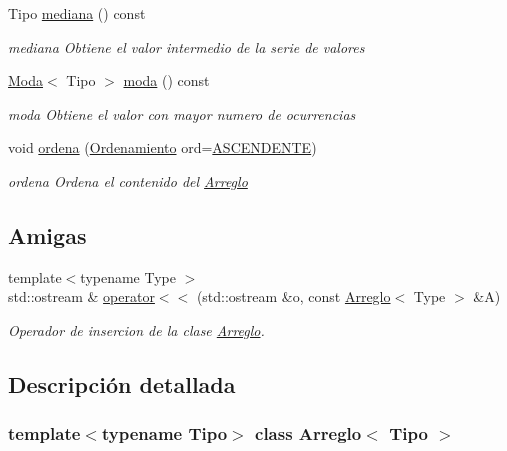 \begin{DoxyCompactItemize}
Tipo \hyperlink{class_arreglo_a84a3c8f3187822db817d8bb29e377e07}{mediana} () const
\begin{DoxyCompactList}\small\item\em mediana Obtiene el valor intermedio de la serie de valores \end{DoxyCompactList}\item 
\hyperlink{struct_moda}{Moda}$<$ Tipo $>$ \hyperlink{class_arreglo_aa88660ef09061682eb6e2a78e96b76c1}{moda} () const
\begin{DoxyCompactList}\small\item\em moda Obtiene el valor con mayor numero de ocurrencias \end{DoxyCompactList}\item 
void \hyperlink{class_arreglo_ac1e8f3ecec261c1829257e144d67e4f7}{ordena} (\hyperlink{arreglo_8h_a19d29c5392079f801023ed938d9ce2d6}{Ordenamiento} ord=\hyperlink{arreglo_8h_a19d29c5392079f801023ed938d9ce2d6a81a8a96faa5cc685dadc157583300652}{A\+S\+C\+E\+N\+D\+E\+N\+TE})
\begin{DoxyCompactList}\small\item\em ordena Ordena el contenido del \hyperlink{class_arreglo}{Arreglo} \end{DoxyCompactList}\end{DoxyCompactItemize}
\subsection*{Amigas}
\begin{DoxyCompactItemize}
\item 
{\footnotesize template$<$typename Type $>$ }\\std\+::ostream \& \hyperlink{class_arreglo_adb4a65563738571a30f77e46a3427138}{operator$<$$<$} (std\+::ostream \&o, const \hyperlink{class_arreglo}{Arreglo}$<$ Type $>$ \&A)
\begin{DoxyCompactList}\small\item\em Operador de insercion de la clase \hyperlink{class_arreglo}{Arreglo}. \end{DoxyCompactList}\end{DoxyCompactItemize}


\subsection{Descripción detallada}
\subsubsection*{template$<$typename Tipo$>$\newline
class Arreglo$<$ Tipo $>$}

